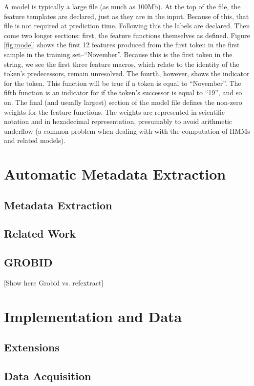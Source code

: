 \documentclass[10pt, oneside]{scrartcl}   	%
\begin{document}
A model is typically a large file (as much as 100Mb). At the top of the file, the feature templates are declared, just as they are in the input. Because of this, that file is not required at prediction time. Following this the labels are declared. Then come two longer sections: first, the feature functions themselves as defined. Figure \ref{fig:model} shows the first 12 features produced from the first token in the first sample in the training set--``November''. Because this is the first token in the string, we see the first three feature macros, which relate to the identity of the token's predecessors, remain unresolved. The fourth, however, shows the indicator for the token. This function will be true if a token is equal to ``November''. The fifth function is an indicator for if the token's successor is equal to ``19'', and so on. The final (and usually largest) section of the model file defines the non-zero weights for the feature functions. The weights are represented in scientific notation and in hexadecimal representation, presumably to avoid arithmetic underflow (a common problem when dealing with with the computation of HMMs and related models).

\section{Automatic Metadata Extraction}
\subsection{Metadata Extraction}
\subsection{Related Work}
\subsection{GROBID}
[Show here Grobid vs. refextract]
\section{Implementation and Data}
\subsection{Extensions}
\subsection{Data Acquisition}
\end{document}
